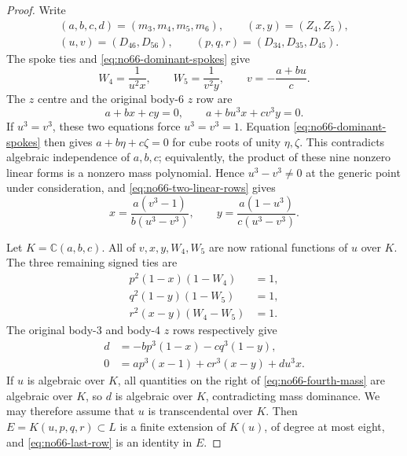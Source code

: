 \documentclass[11pt]{amsart}
\theoremstyle{remark}
\newcommand{\C}{\mathbb C}
\begin{document}
\begin{proof}
Write
\[
 \begin{gathered}
 (a,b,c,d)=(m_3,m_4,m_5,m_6),\qquad (x,y)=(Z_4,Z_5),\\
 (u,v)=(D_{46},D_{56}),\qquad (p,q,r)=(D_{34},D_{35},D_{45}).
 \end{gathered}
\]
The spoke ties and \eqref{eq:no66-dominant-spokes} give
\begin{equation}\label{eq:no66-spoke-recovery}
 W_4=\frac1{u^2x},\qquad W_5=\frac1{v^2y},\qquad
 v=-\frac{a+bu}{c}.
\end{equation}
The $z$ centre and the original body-6 $z$ row are
\begin{equation}\label{eq:no66-two-linear-rows}
 a+bx+cy=0,\qquad a+bu^3x+cv^3y=0.
\end{equation}
If $u^3=v^3$, these two equations force $u^3=v^3=1$.
Equation \eqref{eq:no66-dominant-spokes} then gives
$a+b\eta+c\zeta=0$ for cube roots of unity $\eta,\zeta$.
This contradicts algebraic independence of $a,b,c$; equivalently,
the product of these nine nonzero linear forms is a nonzero mass
polynomial. Hence $u^3-v^3\ne0$ at the generic point under consideration,
and \eqref{eq:no66-two-linear-rows} gives
\begin{equation}\label{eq:no66-rational-shape}
 x=\frac{a(v^3-1)}{b(u^3-v^3)},\qquad
 y=\frac{a(1-u^3)}{c(u^3-v^3)}.
\end{equation}

Let $K=\C(a,b,c)$. All of $v,x,y,W_4,W_5$ are now rational functions
of $u$ over $K$. The three remaining signed ties are
\begin{equation}\label{eq:no66-finite-signed-cover}
 \begin{aligned}
 p^2(1-x)(1-W_4)&=1,\\
 q^2(1-y)(1-W_5)&=1,\\
 r^2(x-y)(W_4-W_5)&=1.
 \end{aligned}
\end{equation}
The original body-3 and body-4 $z$ rows respectively give
\begin{align}
 d&=-bp^3(1-x)-cq^3(1-y),\label{eq:no66-fourth-mass}\\
 0&=ap^3(x-1)+cr^3(x-y)+du^3x.\label{eq:no66-last-row}
\end{align}
If $u$ is algebraic over $K$, all quantities on the right of
\eqref{eq:no66-fourth-mass} are algebraic over $K$, so $d$ is
algebraic over $K$, contradicting mass dominance. We may therefore
assume that $u$ is transcendental over $K$. Then
$E=K(u,p,q,r)\subset L$ is a finite extension of $K(u)$, of degree
at most eight, and \eqref{eq:no66-last-row} is an identity in $E$.


\end{proof}
\end{document}
